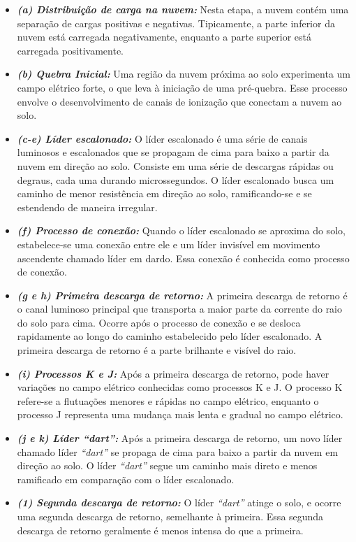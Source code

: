 \documentclass[a4paper, 12pt, onecolumn,singlespacing]{article}
\begin{document}
		\begin{itemize}
			\item  \textbf{\textit{ (a) Distribuição de carga na nuvem:} }Nesta etapa, a nuvem contém uma separação de cargas positivas e negativas. Tipicamente, a parte inferior da nuvem está carregada negativamente, enquanto a parte superior está carregada positivamente.
			
			\item \textbf{\textit{(b) Quebra Inicial:}} Uma região da nuvem próxima ao solo experimenta um campo elétrico forte, o que leva à iniciação de uma pré-quebra. Esse processo envolve o desenvolvimento de canais de ionização que conectam a nuvem ao solo.
			
			\item \textbf{\textit{(c-e) Líder escalonado:}} O líder escalonado é uma série de canais luminosos e escalonados que se propagam de cima para baixo a partir da nuvem em direção ao solo. Consiste em uma série de descargas rápidas ou degraus, cada uma durando microssegundos. O líder escalonado busca um caminho de menor resistência em direção ao solo, ramificando-se e se estendendo de maneira irregular.
			
			\item \textbf{\textit{(f) Processo de conexão:}} Quando o líder escalonado se aproxima do solo, estabelece-se uma conexão entre ele e um líder invisível em movimento ascendente chamado líder em dardo. Essa conexão é conhecida como processo de conexão.
			
			\item \textbf{\textit{(g e h) Primeira descarga de retorno:}} A primeira descarga de retorno é o canal luminoso principal que transporta a maior parte da corrente do raio do solo para cima. Ocorre após o processo de conexão e se desloca rapidamente ao longo do caminho estabelecido pelo líder escalonado. A primeira descarga de retorno é a parte brilhante e visível do raio.
			
			\item \textbf{\textit{(i) Processos K e J:}} Após a primeira descarga de retorno, pode haver variações no campo elétrico conhecidas como processos K e J. O processo K refere-se a flutuações menores e rápidas no campo elétrico, enquanto o processo J representa uma mudança mais lenta e gradual no campo elétrico.
			
			\item \textbf{\textit{(j e k) Líder \textit{``dart''}:}} Após a primeira descarga de retorno, um novo líder chamado líder \textit{``dart''} se propaga de cima para baixo a partir da nuvem em direção ao solo. O líder \textit{``dart''} segue um caminho mais direto e menos ramificado em comparação com o líder escalonado.
			
			\item \textbf{\textit{(1) Segunda descarga de retorno: }}O líder \textit{``dart''} atinge o solo, e ocorre uma segunda descarga de retorno, semelhante à primeira. Essa segunda descarga de retorno geralmente é menos intensa do que a primeira.
			
		\end{itemize}
		
\end{document}
